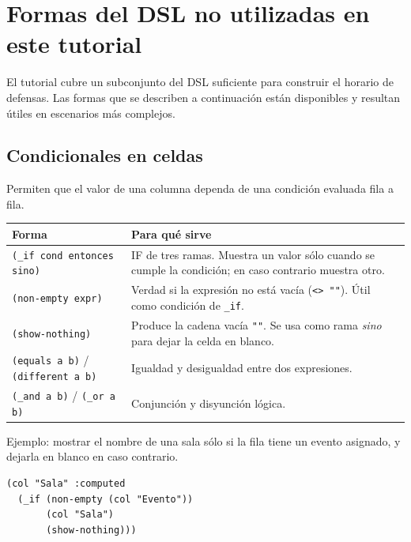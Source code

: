 \documentclass[12pt,a4paper]{report}
\begin{document}
\section{Formas del DSL no utilizadas en este tutorial}
\label{sec:macros-extra}

El tutorial cubre un subconjunto del DSL suficiente para construir el horario
de defensas. Las formas que se describen a continuación están disponibles y
resultan útiles en escenarios más complejos.

\subsection*{Condicionales en celdas}

Permiten que el valor de una columna dependa de una condición evaluada fila
a fila.

\begin{center}
\begin{tabular}{lp{8cm}}
\toprule
\textbf{Forma} & \textbf{Para qué sirve} \\
\midrule
\texttt{(\_if cond entonces sino)} & IF de tres ramas.  Muestra un valor sólo
  cuando se cumple la condición; en caso contrario muestra otro. \\
\texttt{(non-empty expr)} & Verdad si la expresión no está vacía (\texttt{<> ""}).
  Útil como condición de \texttt{\_if}. \\
\texttt{(show-nothing)} & Produce la cadena vacía \texttt{""}.  Se usa como
  rama \emph{sino} para dejar la celda en blanco. \\
\texttt{(equals a b)} / \texttt{(different a b)} & Igualdad y desigualdad
  entre dos expresiones. \\
\texttt{(\_and a b)} / \texttt{(\_or a b)} & Conjunción y disyunción lógica. \\
\bottomrule
\end{tabular}
\end{center}

Ejemplo: mostrar el nombre de una sala sólo si la fila tiene un evento
asignado, y dejarla en blanco en caso contrario.

\begin{lstlisting}
(col "Sala" :computed
  (_if (non-empty (col "Evento"))
       (col "Sala")
       (show-nothing)))
\end{lstlisting}
\end{document}
